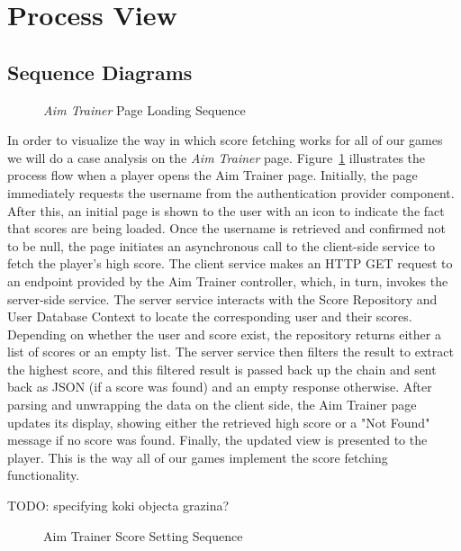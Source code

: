 \documentclass[11pt,a4paper]{article}
\newcommand{\inputdiagram}[1]{}
\begin{document}
\section{Process View}

\subsection{Sequence Diagrams}

\begin{figure}[H]
    \centering
     \begin{adjustbox}{width=0.92\paperwidth,center}       \inputdiagram{aim_trainer_page_sequence.tex}
     \end{adjustbox}
     \caption{\textit{Aim Trainer} Page Loading Sequence}
    \label{fig:aim_trainer_page_sequence}
\end{figure}
In order to visualize the way in which score fetching works for all of
our games we will do a case analysis on the \textit{Aim Trainer} page.
Figure~\ref{fig:aim_trainer_page_sequence} illustrates the process flow
when a player opens the Aim Trainer page. Initially, the page immediately
requests the username from the authentication provider component. After
this, an initial page is shown to the user with an icon to indicate the fact
that scores are being loaded. Once the username is retrieved and confirmed
not to be null, the page initiates an asynchronous call to the client-side
service to fetch the player's high score. The client service makes an HTTP GET
request to an endpoint provided by the Aim Trainer controller, which, in turn,
invokes the server-side service. The server service interacts with the Score
Repository and User Database Context to locate the corresponding user and
their scores. Depending on whether the user and score exist, the repository
returns either a list of scores or an empty list. The server service then
filters the result to extract the highest score, and this filtered result
is passed back up the chain and sent back as JSON (if a score was found)
and an empty response otherwise. After parsing and unwrapping the data on
the client side, the Aim Trainer page updates its display, showing either the
retrieved high score or a "Not Found" message if no score was found. Finally,
the updated view is presented to the player. This is the way all of our
games implement the score fetching functionality.

TODO: specifying koki objecta grazina?

\begin{figure}[H]
    \centering
     \begin{adjustbox}{width=0.92\paperwidth,center}
        \inputdiagram{aim_trainer_set_score_sequence.tex}
     \end{adjustbox}
    \caption{Aim Trainer Score Setting Sequence}
    \label{fig:aim_trainer_set_score_sequence}
\end{figure}
\end{document}
